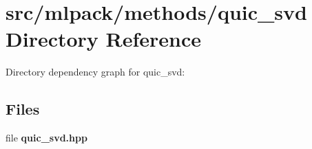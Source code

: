 \section{src/mlpack/methods/quic\-\_\-svd Directory Reference}
\label{dir_5e4ecf283a05df657c038d837ed689e0}
Directory dependency graph for quic\-\_\-svd\-:
\subsection*{Files}
\begin{DoxyCompactItemize}
\item 
file {\bf quic\-\_\-svd.\-hpp}
\end{DoxyCompactItemize}
